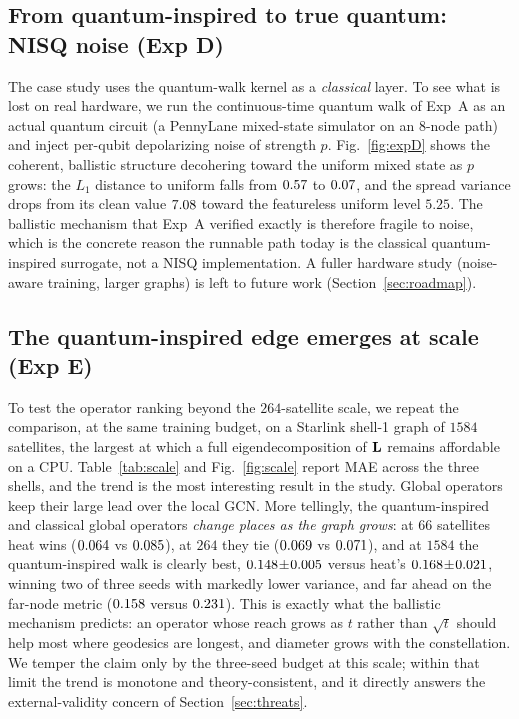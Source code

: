 

\subsection{From quantum-inspired to true quantum: NISQ noise (Exp D)}
The case study uses the quantum-walk kernel as a \emph{classical} layer. To see what is
lost on real hardware, we run the continuous-time quantum walk of Exp~A as an actual
quantum circuit (a PennyLane mixed-state simulator on an $8$-node path) and inject
per-qubit depolarizing noise of strength $p$. Fig.~\ref{fig:expD} shows the coherent,
ballistic structure decohering toward the uniform mixed state as $p$ grows: the $L_1$
distance to uniform falls from $0.57$ to $0.07$, and the spread variance
drops from its clean value $7.08$ toward the featureless uniform level $5.25$. The
ballistic mechanism that Exp~A verified exactly is therefore fragile to noise, which is
the concrete reason the runnable path today is the classical quantum-inspired surrogate,
not a NISQ implementation. A fuller hardware study (noise-aware training, larger graphs)
is left to future work (Section~\ref{sec:roadmap}).



\subsection{The quantum-inspired edge emerges at scale (Exp E)}
\label{sec:expe}
To test the operator ranking beyond the $264$-satellite scale, we repeat the comparison,
at the same training budget, on a Starlink shell-1 graph of $1584$ satellites, the largest
at which a full eigendecomposition of $\mathbf{L}$ remains affordable on a CPU.
Table~\ref{tab:scale} and Fig.~\ref{fig:scale} report MAE across the three shells, and the
trend is the most interesting result in the study. Global operators keep their large lead
over the local GCN. More tellingly, the quantum-inspired and classical global operators
\emph{change places as the graph grows}: at $66$ satellites heat wins
($0.064$ vs $0.085$), at $264$ they tie ($0.069$ vs $0.071$), and at $1584$
the quantum-inspired walk is clearly best, $0.148\!\pm\!0.005$ versus heat's
$0.168\!\pm\!0.021$, winning two of three seeds with markedly lower variance,
and far ahead on the far-node metric ($0.158$ versus $0.231$). This is exactly
what the ballistic mechanism predicts: an operator whose reach grows as $t$ rather than
$\sqrt{t}$ should help most where geodesics are longest, and diameter grows with the
constellation. We temper the claim only by the three-seed budget at this scale; within
that limit the trend is monotone and theory-consistent, and it directly answers the
external-validity concern of Section~\ref{sec:threats}.

